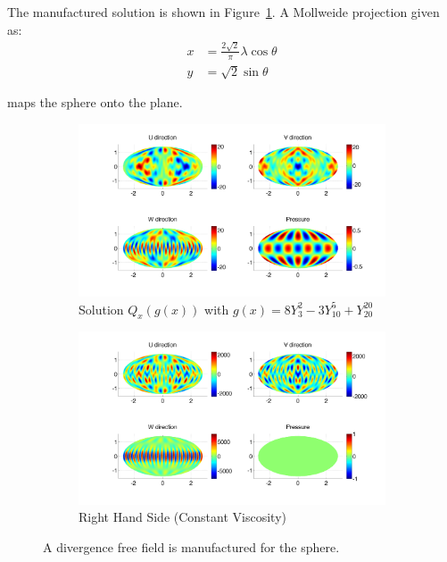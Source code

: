 The manufactured solution is shown in Figure~\ref{fig:manufactured_solution}. A Mollweide projection given as: 
\begin{align*}
x &= \frac{2\sqrt{2}}{\pi} \lambda \cos{\theta} \\
y &= \sqrt{2}\sin{\theta}
\end{align*}

 maps the sphere onto the plane. 

\begin{figure} 
\centering
\begin{subfigure}[b]{\textwidth}
\centering
\includegraphics[width=1.0\textwidth]{../figures/paper2/figures/U_exact.png}
\caption{Solution $Q_x( g(x) )$ with $g(x) = 8 Y_{3}^{2} - 3Y_{10}^{5} + Y_{20}^{20}$}
\end{subfigure}
\begin{subfigure}[b]{\textwidth}
\centering
\includegraphics[width=1.0\textwidth]{../figures/paper2/figures/RHS.png}
\caption{Right Hand Side (Constant Viscosity)}
\end{subfigure}
\caption{A divergence free field is manufactured for the sphere. }
\label{fig:manufactured_solution}
\end{figure} 


